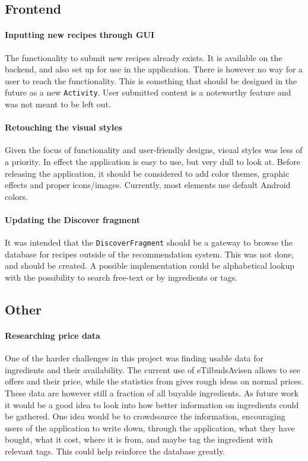 \subsection{Frontend}

\paragraph{Inputting new recipes through GUI}
The functionality to submit new recipes already exists. It is available on the backend, and also set up for use in the application. There is however no way for a user to reach the functionality. This is something that should be designed in the future as a new \texttt{Activity}. User submitted content is a noteworthy feature and was not meant to be left out.

\paragraph{Retouching the visual styles}
Given the focus of functionality and user-friendly designs, visual styles was less of a priority. In effect the application is easy to use, but very dull to look at. Before releasing the application, it should be considered to add color themes, graphic effects and proper icons/images. Currently, most elements use default Android colors.

\paragraph{Updating the Discover fragment}
It was intended that the \texttt{DiscoverFragment} should be a gateway to browse the database for recipes outside of the recommendation system. This was not done, and should be created. A possible implementation could be alphabetical lookup with the possibility to search free-text or by ingredients or tags.

\subsection{Other}

\paragraph{Researching price data}
One of the harder challenges in this project was finding usable data for ingredients and their availability. The current use of eTilbudsAvisen allows to see offers and their price, while the statistics from  gives rough ideas on normal prices.
These data are however still a fraction of all buyable ingredients. As future work it would be a good idea to look into how better information on ingredients could be gathered.
One idea would be to crowdsource the information, encouraging users of the application to write down, through the application, what they have bought, what it cost, where it is from, and maybe tag the ingredient with relevant tags. This could help reinforce the database greatly.